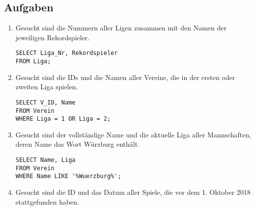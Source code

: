 \documentclass{lehramt-informatik}
\begin{document}


\subsection{Aufgaben}

\renewcommand{\labelenumi}{\alph{enumi})}
\begin{enumerate}
\item Gesucht sind die Nummern aller Ligen zusammen mit den Namen der
jeweiligen Rekordspieler.

\begin{verbatim}
SELECT Liga_Nr, Rekordspieler
FROM Liga;
\end{verbatim}


\item Gesucht sind die IDs und die Namen aller Vereine, die in der
ersten oder zweiten Liga spielen.

\begin{verbatim}
SELECT V_ID, Name
FROM Verein
WHERE Liga = 1 OR Liga = 2;
\end{verbatim}

%

\item Gesucht sind der vollständige Name und die aktuelle Liga aller
Mannschaften, deren Name das Wort Würzburg enthält.

\begin{verbatim}
SELECT Name, Liga
FROM Verein
WHERE Name LIKE '%Wuerzburg%';
\end{verbatim}

%

\item Gesucht sind die ID und das Datum aller Spiele, die vor dem 1.
Oktober 2018 stattgefunden haben.


\end{enumerate}
\end{document}
